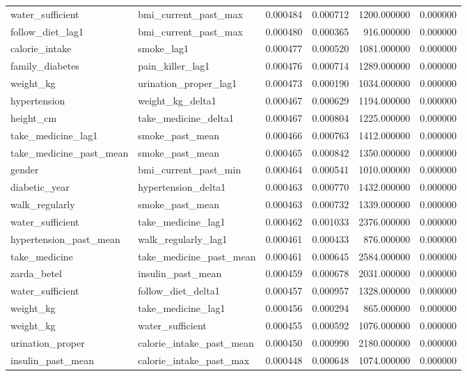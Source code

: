 \begin{longtable}{llrrrr}
water\_sufficient & bmi\_current\_past\_max & 0.000484 & 0.000712 & 1200.000000 & 0.000000 \\
follow\_diet\_lag1 & bmi\_current\_past\_max & 0.000480 & 0.000365 & 916.000000 & 0.000000 \\
calorie\_intake & smoke\_lag1 & 0.000477 & 0.000520 & 1081.000000 & 0.000000 \\
family\_diabetes & pain\_killer\_lag1 & 0.000476 & 0.000714 & 1289.000000 & 0.000000 \\
weight\_kg & urination\_proper\_lag1 & 0.000473 & 0.000190 & 1034.000000 & 0.000000 \\
hypertension & weight\_kg\_delta1 & 0.000467 & 0.000629 & 1194.000000 & 0.000000 \\
height\_cm & take\_medicine\_delta1 & 0.000467 & 0.000804 & 1225.000000 & 0.000000 \\
take\_medicine\_lag1 & smoke\_past\_mean & 0.000466 & 0.000763 & 1412.000000 & 0.000000 \\
take\_medicine\_past\_mean & smoke\_past\_mean & 0.000465 & 0.000842 & 1350.000000 & 0.000000 \\
gender & bmi\_current\_past\_min & 0.000464 & 0.000541 & 1010.000000 & 0.000000 \\
diabetic\_year & hypertension\_delta1 & 0.000463 & 0.000770 & 1432.000000 & 0.000000 \\
walk\_regularly & smoke\_past\_mean & 0.000463 & 0.000732 & 1339.000000 & 0.000000 \\
water\_sufficient & take\_medicine\_lag1 & 0.000462 & 0.001033 & 2376.000000 & 0.000000 \\
hypertension\_past\_mean & walk\_regularly\_lag1 & 0.000461 & 0.000433 & 876.000000 & 0.000000 \\
take\_medicine & take\_medicine\_past\_mean & 0.000461 & 0.000645 & 2584.000000 & 0.000000 \\
zarda\_betel & insulin\_past\_mean & 0.000459 & 0.000678 & 2031.000000 & 0.000000 \\
water\_sufficient & follow\_diet\_delta1 & 0.000457 & 0.000957 & 1328.000000 & 0.000000 \\
weight\_kg & take\_medicine\_lag1 & 0.000456 & 0.000294 & 865.000000 & 0.000000 \\
weight\_kg & water\_sufficient & 0.000455 & 0.000592 & 1076.000000 & 0.000000 \\
urination\_proper & calorie\_intake\_past\_mean & 0.000450 & 0.000990 & 2180.000000 & 0.000000 \\
insulin\_past\_mean & calorie\_intake\_past\_max & 0.000448 & 0.000648 & 1074.000000 & 0.000000 \\

\end{longtable}

